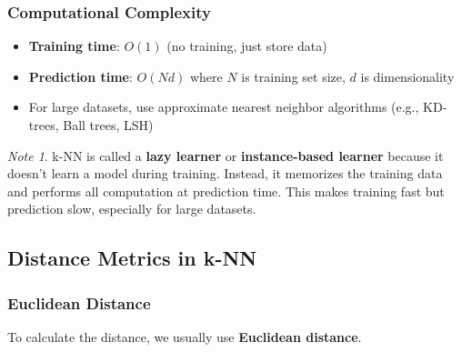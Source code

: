 \documentclass[11pt,a4paper]{article}
\theoremstyle{definition}
\theoremstyle{plain}
\theoremstyle{remark}
\newtheorem*{remark}{Note}
\begin{document}
\subsubsection{Computational Complexity}

\begin{itemize}
    \item \textbf{Training time}: $O(1)$ (no training, just store data)
    \item \textbf{Prediction time}: $O(Nd)$ where $N$ is training set size, $d$ is dimensionality
    \item For large datasets, use approximate nearest neighbor algorithms (e.g., KD-trees, Ball trees, LSH)
\end{itemize}

\begin{remark}
k-NN is called a \textbf{lazy learner} or \textbf{instance-based learner} because it doesn't learn a model during training. Instead, it memorizes the training data and performs all computation at prediction time. This makes training fast but prediction slow, especially for large datasets.
\end{remark}

\subsection{Distance Metrics in k-NN}

\subsubsection{Euclidean Distance}

To calculate the distance, we usually use \textbf{Euclidean distance}.

\begin{center}
\end{center}
\end{document}
